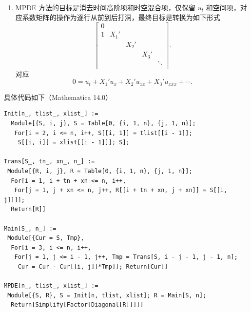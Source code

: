 \begin{enumerate}
    \item MPDE 方法的目标是消去时间高阶项和时空混合项，仅保留 $u_t$ 和空间项，对应系数矩阵的操作为逐行从前到后打洞，最终目标是转换为如下形式
          \[
              \begin{bmatrix}
                  0                               \\
                  1 & X_1'                        \\
                    &      & X_2'                 \\
                    &      &      & X_3'          \\
                    &      &      &      & \ddots \\
              \end{bmatrix}.
          \]
          对应
          \[
              0 = u_t + X_1' u_x + X_2' u_{xx} + X_3' u_{xxx} + \cdots.
          \]
\end{enumerate}
具体代码如下（Mathematica 14.0）
\begin{lstlisting}
Init[n_, tlist_, xlist_] :=
  Module[{S, i, j}, S = Table[0, {i, 1, n}, {j, 1, n}];
   For[i = 2, i <= n, i++, S[[i, 1]] = tlist[[i - 1]];
    S[[i, i]] = xlist[[i - 1]]]; S];

Trans[S_, tn_, xn_, n_] :=
 Module[{R, i, j}, R = Table[0, {i, 1, n}, {j, 1, n}];
  For[i = 1, i + tn + xn <= n, i++,
   For[j = 1, j + xn <= n, j++, R[[i + tn + xn, j + xn]] = S[[i, j]]]];
  Return[R]]

Main[S_, n_] :=
 Module[{Cur = S, Tmp},
  For[i = 3, i <= n, i++,
   For[j = 1, j <= i - 1, j++, Tmp = Trans[S, i - j - 1, j - 1, n];
    Cur = Cur - Cur[[i, j]]*Tmp]]; Return[Cur]]

MPDE[n_, tlist_, xlist_] :=
 Module[{S, R}, S = Init[n, tlist, xlist]; R = Main[S, n];
  Return[Simplify[Factor[Diagonal[R]]]]]
\end{lstlisting}

